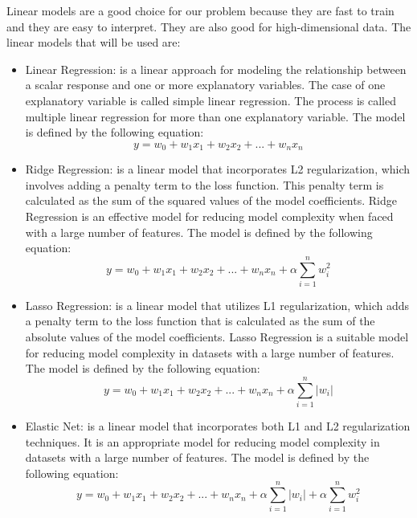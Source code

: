 \documentclass{report}
\begin{document}
Linear models are a good choice for our problem because they are fast to train and they are easy to interpret. They are also good for high-dimensional data. The linear models that will be used are:
\begin{itemize}
    \item Linear Regression: is a linear approach for modeling the relationship between a scalar response and one or more explanatory variables. The case of one explanatory variable is called simple linear regression. The process is called multiple linear regression for more than one explanatory variable. \cite{scikit-learn} The model is defined by the following equation:
    \begin{equation}
        y = w_0 + w_1x_1 + w_2x_2 + ... + w_nx_n
    \end{equation}
    \item Ridge Regression: is a linear model that incorporates L2 regularization, which involves adding a penalty term to the loss function. This penalty term is calculated as the sum of the squared values of the model coefficients. Ridge Regression is an effective model for reducing model complexity when faced with a large number of features\cite{scikit-learn}.  The model is defined by the following equation:
    \begin{equation}
        y = w_0 + w_1x_1 + w_2x_2 + ... + w_nx_n + \alpha \sum_{i=1}^{n} w_i^2
    \end{equation}
    \item Lasso Regression: is a linear model that utilizes L1 regularization, which adds a penalty term to the loss function that is calculated as the sum of the absolute values of the model coefficients. Lasso Regression is a suitable model for reducing model complexity in datasets with a large number of features\cite{scikit-learn}. The model is defined by the following equation:
    \begin{equation}
        y = w_0 + w_1x_1 + w_2x_2 + ... + w_nx_n + \alpha \sum_{i=1}^{n} |w_i|
    \end{equation}
    \item Elastic Net: is a linear model that incorporates both L1 and L2 regularization techniques. It is an appropriate model for reducing model complexity in datasets with a large number of features\cite{scikit-learn}. The model is defined by the following equation:
    \begin{equation}
        y = w_0 + w_1x_1 + w_2x_2 + ... + w_nx_n + \alpha \sum_{i=1}^{n} |w_i| + \alpha \sum_{i=1}^{n} w_i^2
    \end{equation}
\end{itemize}
\end{document}

